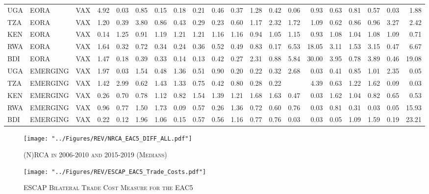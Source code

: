 \documentclass[a4paper]{article}
\begin{document}
\begin{table}[ht]
{\begin{tabular}{lllrrrrrrrrrrrrrrrrr}
  UGA & EORA & VAX & 4.92 & 0.03 & 0.85 & 0.15 & 0.18 & 0.21 & 0.46 & 0.37 & 1.28 & 0.42 & 0.06 & 0.93 & 0.63 & 0.81 & 0.57 & 0.03 & 1.88 \\ 
  TZA & EORA & VAX & 1.20 & 0.39 & 3.80 & 0.86 & 0.43 & 0.29 & 0.23 & 0.60 & 1.17 & 2.32 & 1.72 & 1.09 & 0.62 & 0.86 & 0.96 & 3.27 & 2.42 \\ 
  KEN & EORA & VAX & 0.14 & 1.25 & 0.91 & 1.19 & 1.21 & 1.21 & 1.16 & 1.16 & 0.94 & 1.05 & 1.15 & 0.93 & 1.08 & 1.04 & 1.08 & 1.09 & 0.71 \\ 
  RWA & EORA & VAX & 1.64 & 0.32 & 0.72 & 0.34 & 0.24 & 0.36 & 0.52 & 0.49 & 0.83 & 0.17 & 6.53 & 18.05 & 3.11 & 1.53 & 3.15 & 0.47 & 6.67 \\ 
  BDI & EORA & VAX & 1.47 & 0.18 & 0.39 & 0.33 & 0.14 & 0.13 & 0.42 & 0.27 & 2.31 & 0.88 & 5.84 & 30.00 & 3.95 & 0.78 & 3.89 & 0.46 & 19.08 \\ \midrule
    UGA & EMERGING & VAX & 1.97 & 0.03 & 1.54 & 0.48 & 1.36 & 0.51 & 0.90 & 0.20 & 0.22 & 0.32 & 2.68 & 0.03 & 0.41 & 0.85 & 1.01 & 2.35 & 0.05 \\ 
  TZA & EMERGING & VAX & 1.42 & 2.99 & 0.62 & 1.43 & 1.33 & 0.75 & 0.42 & 0.80 & 0.28 & 0.22 &  & 4.39 & 0.63 & 1.22 & 1.62 & 0.09 & 0.03 \\ 
  KEN & EMERGING & VAX & 0.26 & 0.70 & 0.78 & 1.12 & 0.82 & 1.54 & 1.39 & 1.21 & 1.68 & 1.63 & 0.47 & 0.03 & 1.62 & 1.04 & 0.82 & 0.65 & 0.53 \\ 
  RWA & EMERGING & VAX & 0.96 & 0.77 & 1.50 & 1.73 & 0.09 & 0.57 & 0.26 & 1.36 & 0.72 & 0.60 & 0.76 & 0.03 & 0.81 & 0.31 & 0.03 & 0.05 & 15.93 \\ 
  BDI & EMERGING & VAX & 0.22 & 0.12 & 1.96 & 1.06 & 0.15 & 0.57 & 0.56 & 1.16 & 0.77 & 0.76 & 0.03 & 0.03 & 0.05 & 1.09 & 1.59 & 0.19 & 23.21 \\ 
   \bottomrule
\end{tabular}
}
\end{table}

\begin{figure}[h!]
\centering
\caption{\label{fig:NRCA_Diff}\textsc{(N)RCA in 2006-2010 and 2015-2019 (Medians)}}
\texttt{[image: "../Figures/REV/NRCA\_EAC5\_DIFF\_ALL.pdf"]} %
\end{figure}
\FloatBarrier


\begin{figure}[h!]
\centering
\caption{\label{fig:ESCAP_EAC}\textsc{ESCAP Bilateral Trade Cost Measure for the EAC5}}
\texttt{[image: "../Figures/REV/ESCAP\_EAC5\_Trade\_Costs.pdf"]} %
\end{figure}
\FloatBarrier
\end{document}
